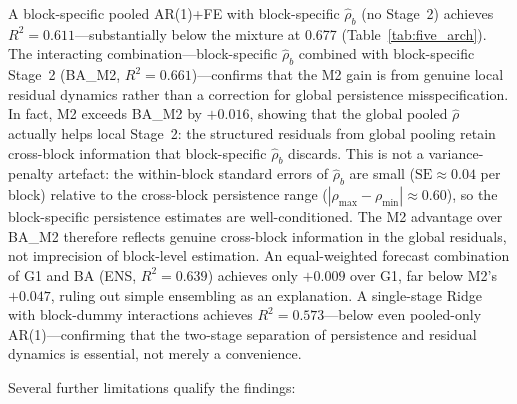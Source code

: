 \documentclass[11pt,a4paper]{article}
\begin{document}
A block-specific pooled AR(1)+FE with block-specific $\hat\rho_b$ (no Stage~2) achieves $R^2 = 0.611$---substantially below the mixture at 0.677 (Table~\ref{tab:five_arch}). The interacting combination---block-specific $\hat\rho_b$ combined with block-specific Stage~2 (BA\_M2, $R^2 = 0.661$)---confirms that the M2 gain is from genuine local residual dynamics rather than a correction for global persistence misspecification. In fact, M2 exceeds BA\_M2 by $+0.016$, showing that the global pooled $\hat\rho$ actually helps local Stage~2: the structured residuals from global pooling retain cross-block information that block-specific $\hat\rho_b$ discards. This is not a variance-penalty artefact: the within-block standard errors of $\hat\rho_b$ are small ($\mathrm{SE} \approx 0.04$ per block) relative to the cross-block persistence range ($|\rho_{\max} - \rho_{\min}| \approx 0.60$), so the block-specific persistence estimates are well-conditioned. The M2 advantage over BA\_M2 therefore reflects genuine cross-block information in the global residuals, not imprecision of block-level estimation. An equal-weighted forecast combination of G1 and BA (ENS, $R^2 = 0.639$) achieves only $+0.009$ over G1, far below M2's $+0.047$, ruling out simple ensembling as an explanation. A single-stage Ridge with block-dummy interactions achieves $R^2 = 0.573$---below even pooled-only AR(1)---confirming that the two-stage separation of persistence and residual dynamics is essential, not merely a convenience.

Several further limitations qualify the findings:
\end{document}
